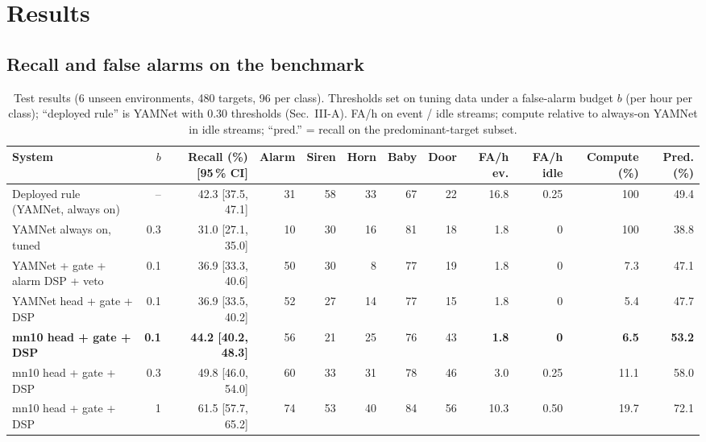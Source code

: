 \documentclass[conference]{IEEEtran}
\begin{document}
\section{Results}
\subsection{Recall and false alarms on the benchmark}
\begin{table}[t]
\centering\caption{Test results (6 unseen environments, 480 targets, 96 per class). Thresholds set on tuning data under a
false-alarm budget $b$ (per hour per class); ``deployed rule'' is YAMNet with 0.30 thresholds (Sec.~III-A). FA/h on event / idle streams;
compute relative to always-on YAMNet in idle streams; ``pred.'' = recall on the predominant-target subset.}\label{tab:main}
\setlength{\tabcolsep}{3.5pt}
\begin{tabular}{lrrrrrrrrrrr}
\toprule
System & $b$ & Recall (\%) [95\,\% CI] & Alarm & Siren & Horn & Baby & Door & FA/h ev. & FA/h idle & Compute (\%) & Pred. (\%) \\
\midrule
Deployed rule (YAMNet, always on) & -- & 42.3 [37.5, 47.1] & 31 & 58 & 33 & 67 & 22 & 16.8 & 0.25 & 100 & 49.4 \\
YAMNet always on, tuned & 0.3 & 31.0 [27.1, 35.0] & 10 & 30 & 16 & 81 & 18 & 1.8 & 0 & 100 & 38.8 \\
YAMNet + gate + alarm DSP + veto & 0.1 & 36.9 [33.3, 40.6] & 50 & 30 & 8 & 77 & 19 & 1.8 & 0 & 7.3 & 47.1 \\
YAMNet head + gate + DSP & 0.1 & 36.9 [33.5, 40.2] & 52 & 27 & 14 & 77 & 15 & 1.8 & 0 & 5.4 & 47.7 \\
\textbf{mn10 head + gate + DSP} & \textbf{0.1} & \textbf{44.2 [40.2, 48.3]} & 56 & 21 & 25 & 76 & 43 & \textbf{1.8} & \textbf{0} & \textbf{6.5} & \textbf{53.2} \\
mn10 head + gate + DSP & 0.3 & 49.8 [46.0, 54.0] & 60 & 33 & 31 & 78 & 46 & 3.0 & 0.25 & 11.1 & 58.0 \\
mn10 head + gate + DSP & 1 & 61.5 [57.7, 65.2] & 74 & 53 & 40 & 84 & 56 & 10.3 & 0.50 & 19.7 & 72.1 \\
\bottomrule
\end{tabular}
\end{table}
\end{document}
